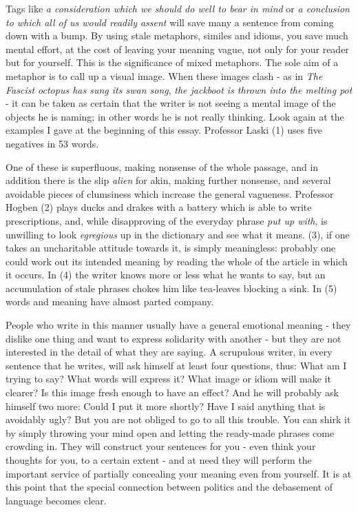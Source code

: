 Tags like \textit{a consideration which we should do well to bear in mind} or \textit{a conclusion to which all of us would readily assent} will save many a sentence from coming down with a bump. By using stale metaphors, similes and idioms, you save much mental effort, at the cost of leaving your meaning vague, not only for your reader but for yourself. This is the significance of mixed metaphors. The sole aim of a metaphor is to call up a visual image. When these images clash - as in \textit{The Fascist octopus has sung its swan song}, \textit{the jackboot is thrown into the melting pot} - it can be taken as certain that the writer is not seeing a mental image of the objects he is naming; in other words he is not really thinking. Look again at the examples I gave at the beginning of this essay. Professor Laski (1) uses five negatives in 53 words.\par

One of these is superfluous, making nonsense of the whole passage, and in addition there is the slip \textit{alien} for akin, making further nonsense, and several avoidable pieces of clumsiness which increase the general vagueness. Professor Hogben (2) plays ducks and drakes with a battery which is able to write prescriptions, and, while disapproving of the everyday phrase \textit{put up with}, is unwilling to look \textit{egregious} up in the dictionary and see what it means. (3), if one takes an uncharitable attitude towards it, is simply meaningless: probably one could work out its intended meaning by reading the whole of the article in which it occurs. In (4) the writer knows more or less what he wants to say, but an accumulation of stale phrases chokes him like tea-leaves blocking a sink. In (5) words and meaning have almost parted company.\par

People who write in this manner usually have a general emotional meaning - they dislike one thing and want to express solidarity with another - but they are not interested in the detail of what they are saying. A scrupulous writer, in every sentence that he writes, will ask himself at least four questions, thus: What am I trying to say? What words will express it? What image or idiom will make it clearer? Is this image fresh enough to have an effect? And he will probably ask himself two more: Could I put it more shortly? Have I said anything that is avoidably ugly? But you are not obliged to go to all this trouble. You can shirk it by simply throwing your mind open and letting the ready-made phrases come crowding in. They will construct your sentences for you - even think your thoughts for you, to a certain extent - and at need they will perform the important service of partially concealing your meaning even from yourself. It is at this point that the special connection between politics and the debasement of language becomes clear.\par


